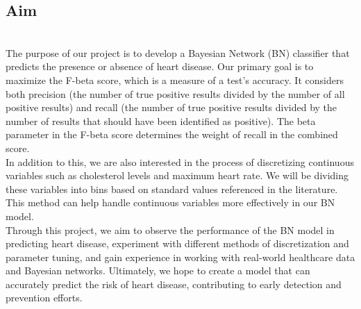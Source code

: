 \documentclass[letterpaper]{article}
\begin{document}
\subsection{Aim}
\\
The purpose of our project is to develop a Bayesian Network (BN) classifier that predicts the presence or absence of heart disease. Our primary goal is to maximize the F-beta score, which is a measure of a test's accuracy. It considers both precision (the number of true positive results divided by the number of all positive results) and recall (the number of true positive results divided by the number of results that should have been identified as positive). The beta parameter in the F-beta score determines the weight of recall in the combined score. \\
In addition to this, we are also interested in the process of discretizing continuous variables such as cholesterol levels and maximum heart rate. We will be dividing these variables into bins based on standard values referenced in the literature. This method can help handle continuous variables more effectively in our BN model.\\
Through this project, we aim to observe the performance of the BN model in predicting heart disease, experiment with different methods of discretization and parameter tuning, and gain experience in working with real-world healthcare data and Bayesian networks. Ultimately, we hope to create a model that can accurately predict the risk of heart disease, contributing to early detection and prevention efforts.
\end{document}
